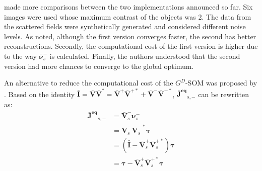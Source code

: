 			\cite{pan2010comparison} made more comparisons between the two implementations announced so far. Six images were used whose maximum contrast of the objects was 2. The data from the scattered fields were synthetically generated and considered different noise levels. As noted, although the first version converges faster, the second has better reconstructions. Secondly, the computational cost of the first version is higher due to the way $\boldsymbol{\bar{\nu}}_s^-$ is calculated. Finally, the authors understood that the second version had more chances to converge to the global optimum.
			
			An alternative to reduce the computational cost of the $G^D$-SOM was proposed by \cite{zhong2010improved}. Based on the identity $\mathbf{\bar{I}} = \mathbf{\bar{V}}\mathbf{\bar{V}}^* = \mathbf{\bar{V}}^+\mathbf{\bar{V}}^{+*} + \mathbf{\bar{V}}^-\mathbf{\bar{V}}^{-*}$, $\mathbf{\bar{J}^{eq}}_{s,-}$ can be rewritten as:
			\begin{align}
				\mathbf{\bar{J}^{eq}}_{s,-} &= \mathbf{\bar{V}}^-_s\boldsymbol{\nu}^-_s \nonumber \\
				&= \mathbf{\bar{V}}^-_s\mathbf{\bar{V}}^{-*}_s\boldsymbol{\tau} \nonumber \\
				&= \left(\mathbf{\bar{I}}-\mathbf{\bar{V}}^+_s\mathbf{\bar{V}}^{+*}_s\right)\boldsymbol{\tau} \nonumber \\
				&= \boldsymbol{\tau}-\mathbf{\bar{V}}^+_s\mathbf{\bar{V}}^{+*}_s\boldsymbol{\tau} \label{eq:3:deterministic:som:svdsimplification}
			\end{align}
		
